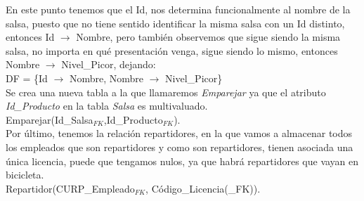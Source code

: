 \documentclass[11pt,letterpaper]{article}
\begin{document}
En este punto tenemos que el Id, nos determina funcionalmente al nombre de la salsa, puesto que no tiene sentido identificar la misma salsa con un Id distinto, entonces Id \(\rightarrow\) Nombre, pero también observemos que sigue siendo la misma salsa, no importa en qué presentación venga, sigue siendo lo mismo, entonces Nombre \(\rightarrow\) Nivel\_Picor, dejando: \\

DF = \{Id \(\rightarrow\) Nombre, Nombre \(\rightarrow\) Nivel\_Picor\}\\

Se crea una nueva tabla a la que llamaremos \textit{Emparejar} ya que el atributo \textit{Id\_Producto} en la tabla \textit{Salsa} es multivaluado.\\

Emparejar(Id\_Salsa\(_{FK}\),Id\_Producto\(_{FK}\)).\\

Por último, tenemos la relación repartidores, en la que vamos a almacenar todos los empleados que son repartidores y como son repartidores, tienen asociada una única licencia, puede que tengamos nulos, ya que habrá repartidores que vayan en bicicleta.\\

Repartidor(CURP\_Empleado\(_{FK}\), Código\_Licencia(\_{FK})).

\end{document}
